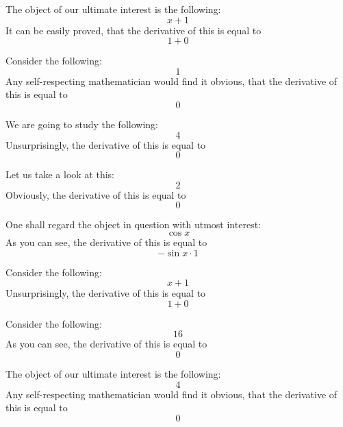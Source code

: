 \documentclass{article}
\begin{document}
The object of our ultimate interest is the following:
\begin{equation}
x + 1 
\end{equation}
It can be easily proved, that the derivative of this is equal to
\begin{equation}
1 + 0 
\end{equation}

Consider the following:
\begin{equation}
1 
\end{equation}
Any self-respecting mathematician would find it obvious, that the derivative of this is equal to
\begin{equation}
0 
\end{equation}

We are going to study the following:
\begin{equation}
4 
\end{equation}
Unsurprisingly, the derivative of this is equal to
\begin{equation}
0 
\end{equation}

Let us take a look at this:
\begin{equation}
2 
\end{equation}
Obviously, the derivative of this is equal to
\begin{equation}
0 
\end{equation}

One shall regard the object in question with utmost interest:
\begin{equation}
\cos x 
\end{equation}
As you can see, the derivative of this is equal to
\begin{equation}
-\sin x \cdot 1 
\end{equation}

Consider the following:
\begin{equation}
x + 1 
\end{equation}
Unsurprisingly, the derivative of this is equal to
\begin{equation}
1 + 0 
\end{equation}

Consider the following:
\begin{equation}
16 
\end{equation}
As you can see, the derivative of this is equal to
\begin{equation}
0 
\end{equation}

The object of our ultimate interest is the following:
\begin{equation}
4 
\end{equation}
Any self-respecting mathematician would find it obvious, that the derivative of this is equal to
\begin{equation}
0 
\end{equation}
\end{document}
